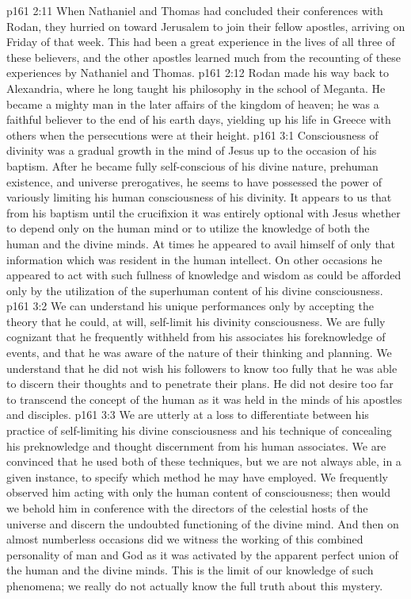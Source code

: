 \vs p161 2:11 \pc When Nathaniel and Thomas had concluded their conferences with Rodan, they hurried on toward Jerusalem to join their fellow apostles, arriving on Friday of that week. This had been a great experience in the lives of all three of these believers, and the other apostles learned much from the recounting of these experiences by Nathaniel and Thomas.
\vs p161 2:12 Rodan made his way back to Alexandria, where he long taught his philosophy in the school of Meganta. He became a mighty man in the later affairs of the kingdom of heaven; he was a faithful believer to the end of his earth days, yielding up his life in Greece with others when the persecutions were at their height.
\vs p161 3:1 Consciousness of divinity was a gradual growth in the mind of Jesus up to the occasion of his baptism. After he became fully self\hyp{}conscious of his divine nature, prehuman existence, and universe prerogatives, he seems to have possessed the power of variously limiting his human consciousness of his divinity. It appears to us that from his baptism until the crucifixion it was entirely optional with Jesus whether to depend only on the human mind or to utilize the knowledge of both the human and the divine minds. At times he appeared to avail himself of only that information which was resident in the human intellect. On other occasions he appeared to act with such fullness of knowledge and wisdom as could be afforded only by the utilization of the superhuman content of his divine consciousness.
\vs p161 3:2 We can understand his unique performances only by accepting the theory that he could, at will, self\hyp{}limit his divinity consciousness. We are fully cognizant that he frequently withheld from his associates his foreknowledge of events, and that he was aware of the nature of their thinking and planning. We understand that he did not wish his followers to know too fully that he was able to discern their thoughts and to penetrate their plans. He did not desire too far to transcend the concept of the human as it was held in the minds of his apostles and disciples.
\vs p161 3:3 We are utterly at a loss to differentiate between his practice of self\hyp{}limiting his divine consciousness and his technique of concealing his preknowledge and thought discernment from his human associates. We are convinced that he used both of these techniques, but we are not always able, in a given instance, to specify which method he may have employed. We frequently observed him acting with only the human content of consciousness; then would we behold him in conference with the directors of the celestial hosts of the universe and discern the undoubted functioning of the divine mind. And then on almost numberless occasions did we witness the working of this combined personality of man and God as it was activated by the apparent perfect union of the human and the divine minds. This is the limit of our knowledge of such phenomena; we really do not actually know the full truth about this mystery.
\quizlink
